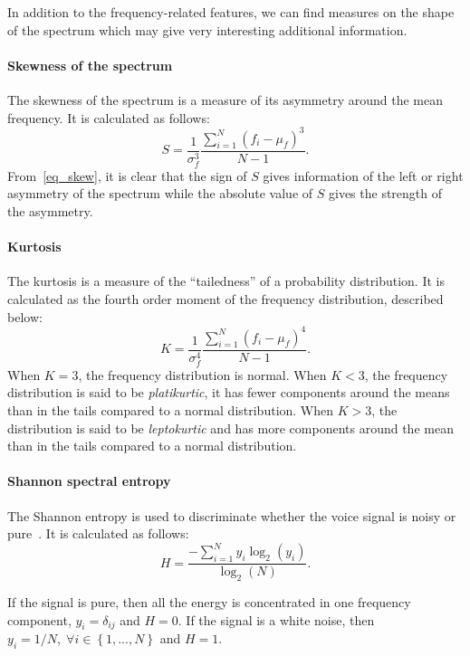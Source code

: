 In addition to the frequency-related features, we can find measures on the shape of the spectrum which may give very interesting additional information. 
\paragraph{Skewness of the spectrum}
The skewness of the spectrum is a measure of its asymmetry around the mean frequency. It is calculated as follows:
\begin{equation}
\label{eq_skew}
	S = \frac{1}{\sigma_f^3}\frac{\sum\limits_{i=1}^{N} \left(f_i - \mu_f\right)^3}{N-1}.
\end{equation}
From~\eqref{eq_skew}, it is clear that the sign of $S$ gives information of the left or right asymmetry of the spectrum while the absolute value of $S$ gives the strength of the asymmetry. 
\paragraph{Kurtosis}
The kurtosis is a measure of the ``tailedness'' of a probability distribution. It is calculated as the fourth order moment of the frequency distribution, described below:
\begin{equation}
\label{eq_kurtosis}
	K = \frac{1}{\sigma_f^4}\frac{\sum\limits_{i=1}^{N} \left(f_i - \mu_f\right)^4}{N-1}.
\end{equation}
When $K=3$, the frequency distribution is normal. When $K<3$, the frequency distribution is said to be \textit{platikurtic}, it has fewer components around the means than in the tails compared to a normal distribution. When $K>3$, the distribution is said to be \textit{leptokurtic} and has more components around the mean than in the tails compared to a normal distribution.
\paragraph{Shannon spectral entropy}
The Shannon entropy is used to discriminate whether the voice signal is noisy or pure~\cite{Nunes2004}. It is calculated as follows:
\begin{equation}
\label{eq:entropy}
	H = \frac{-\sum\limits_{i=1}^{N} y_i \log_2 \left(y_i\right)}{\log_2 \left(N\right)}.
\end{equation}

If the signal is pure, then all the energy is concentrated in one frequency component, \ie{} $y_i = \delta_{ij}$ and $H=0$. If the signal is a white noise, then $y_i = 1/N, \; \forall i \in \left\lbrace 1,...,N \right\rbrace$ and $H=1$.
